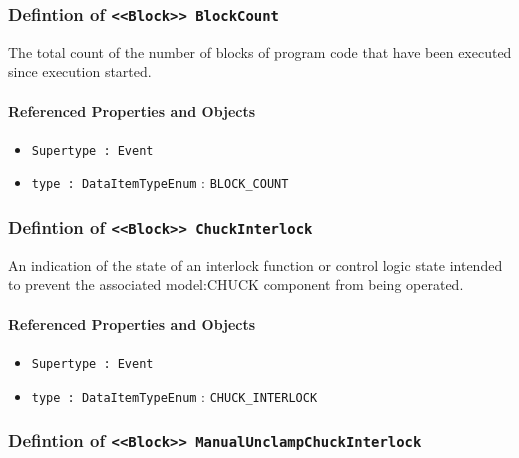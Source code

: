 \subsubsection{Defintion of \texttt{<<Block>> BlockCount}}
  \label{type:BlockCount}

\FloatBarrier

The total count of the number of blocks of program code that have been executed since execution started.

\FloatBarrier
\paragraph{Referenced Properties and Objects}

\begin{itemize}
\item \texttt{Supertype : Event}

\item \texttt{type : DataItemTypeEnum} : \texttt{BLOCK_COUNT}

\end{itemize}
\FloatBarrier
\subsubsection{Defintion of \texttt{<<Block>> ChuckInterlock}}
  \label{type:ChuckInterlock}

\FloatBarrier

An indication of the state of an interlock function or control logic state intended to prevent the associated {model:CHUCK} component from being operated.

\FloatBarrier
\paragraph{Referenced Properties and Objects}

\begin{itemize}
\item \texttt{Supertype : Event}

\item \texttt{type : DataItemTypeEnum} : \texttt{CHUCK_INTERLOCK}

\end{itemize}
\FloatBarrier
\subsubsection{Defintion of \texttt{<<Block>> ManualUnclampChuckInterlock}}
  \label{type:ManualUnclampChuckInterlock}

